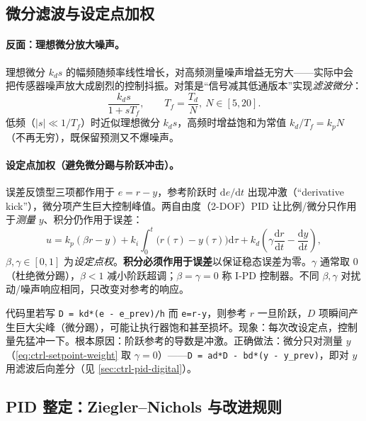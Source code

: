 \subsection{微分滤波与设定点加权}
\label{sec:ctrl-pid-filter}

\paragraph{反面：理想微分放大噪声。}
理想微分 $k_ds$ 的幅频随频率线性增长，对高频测量噪声增益无穷大——实际中会把传感器噪声放大成剧烈的控制抖振。对策是“信号减其低通版本”实现\emph{滤波微分}\cite{astrom2008feedback}：
\begin{equation}
  \frac{k_ds}{1+sT_f},\qquad T_f=\frac{T_d}{N},\ N\in[5,20].
  \label{eq:ctrl-filt-deriv}
\end{equation}
低频（$|s|\ll1/T_f$）时近似理想微分 $k_ds$，高频时增益饱和为常值 $k_d/T_f=k_pN$（不再无穷），既保留预测又不爆噪声。

\paragraph{设定点加权（避免微分踢与阶跃冲击）。}
误差反馈型三项都作用于 $e=r-y$，参考阶跃时 $\mathrm de/\mathrm dt$ 出现冲激（“derivative kick”），微分项产生巨大控制峰值。两自由度（2-DOF）PID 让比例/微分只作用于\emph{测量} $y$、积分仍作用于误差\cite{astrom2008feedback}：
\begin{equation}
  u=k_p(\beta r-y)+k_i\int_0^t\!\big(r(\tau)-y(\tau)\big)\mathrm d\tau+k_d\!\left(\gamma\frac{\mathrm dr}{\mathrm dt}-\frac{\mathrm dy}{\mathrm dt}\right),
  \label{eq:ctrl-setpoint-weight}
\end{equation}
$\beta,\gamma\in[0,1]$ 为\emph{设定点权}。\textbf{积分必须作用于误差}以保证稳态误差为零。$\gamma$ 通常取 $0$（杜绝微分踢），$\beta<1$ 减小阶跃超调；$\beta=\gamma=0$ 称 I-PD 控制器。不同 $\beta,\gamma$ 对扰动/噪声响应相同，只改变对参考的响应。

\begin{pitfall}
代码里若写 \texttt{D = kd*(e - e\_prev)/h} 而 \texttt{e=r-y}，则参考 $r$ 一旦阶跃，$D$ 项瞬间产生巨大尖峰（微分踢），可能让执行器饱和甚至损坏。现象：每次改设定点，控制量先猛冲一下。根本原因：阶跃参考的导数是冲激。正确做法：微分只对测量 $y$（\cref{eq:ctrl-setpoint-weight} 取 $\gamma=0$）——\texttt{D = ad*D - bd*(y - y\_prev)}，即对 $y$ 用滤波后向差分（见 \cref{sec:ctrl-pid-digital}）。
\end{pitfall}

\subsection{PID 整定：Ziegler--Nichols 与改进规则}
\label{sec:ctrl-pid-tuning}

